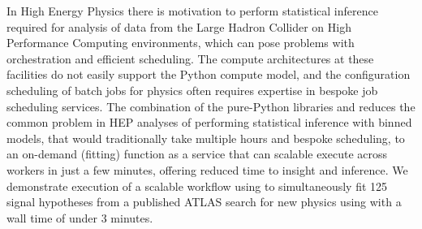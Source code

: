 In High Energy Physics there is motivation to perform statistical inference required for analysis of data from the Large Hadron Collider on High Performance Computing environments, which can pose problems with orchestration and efficient scheduling.
The compute architectures at these facilities do not easily support the Python compute model, and the configuration scheduling of batch jobs for physics often requires expertise in bespoke job scheduling services.
The combination of the pure-Python libraries \pyhf{} and \funcX{} reduces the common problem in HEP analyses of performing statistical inference with binned models, that would traditionally take multiple hours and bespoke scheduling, to an on-demand (fitting) function as a service that can scalable execute across workers in just a few minutes, offering reduced time to insight and inference.
We demonstrate execution of a scalable workflow using \funcX{} to simultaneously fit 125 signal hypotheses from a published ATLAS search for new physics using \pyhf{} with a wall time of under 3 minutes.
